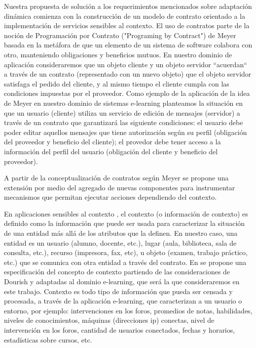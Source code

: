 Nuestra propuesta de solución a los requerimientos mencionados sobre adaptación
dinámica comienza con la construcción de un modelo de contrato orientado a la
implementación de servicios sensibles al contexto. El uso de contratos parte de
la noción de Programación por Contrato ("Programing by Contract") de Meyer
\cite{Meyer} basada en la metáfora de que un elemento de un sistema de software
colabora con otro, manteniendo obligaciones y beneficios mutuos. En nuestro
dominio de aplicación consideraremos que un objeto cliente y un objeto servidor
``acuerdan`` a través de un contrato (representado con un nuevo objeto) que el
objeto servidor satisfaga el pedido del cliente, y al mismo tiempo el cliente
cumpla con las condiciones impuestas por el proveedor. Como ejemplo de la
aplicación de la idea de Meyer en  nuestro dominio de sistemas e-learning
planteamos la situación en que un usuario (cliente) utiliza un servicio de
edición de mensajes (servidor) a través de un contrato que garantizará las
siguiente condiciones: el usuario debe poder editar aquellos mensajes que tiene
autorización según su perfil (obligación del proveedor y beneficio del cliente);
el provedor debe tener acceso a la información del perfil del usuario
(obligación del cliente y beneficio del proveedor).

A partir de la conceptualización de contratos según Meyer se propone una
extensión por medio del agregado de nuevas componentes para instrumentar
mecanismos que permitan ejecutar acciones dependiendo del contexto. 

En aplicaciones sensibles al contexto \cite{Dey}, el contexto (o información de
contexto) es definido como la información que puede ser usada para caracterizar
la situación de una entidad más allá de los atributos que la definen. En nuestro
caso, una entidad es un usuario (alumno, docente, etc.), lugar (aula,
biblioteca, sala de consulta, etc.), recurso (impresora, fax, etc), u objeto
(examen, trabajo práctico, etc.) que se comunica con otra entidad a través del
contrato. En \cite{libro5} se propone una especificación del concepto de
contexto partiendo de las consideraciones de Dourish \cite{contexto} y adaptadas
al dominio e-learning, que será la que consideraremos en este trabajo. Contexto
es todo tipo de información que pueda ser censada y procesada, a través de la
aplicación e-learning, que caracterizan a un usuario o entorno, por ejemplo:
intervenciones en los foros, promedios de notas, habilidades, niveles de
conocimientos, máquinas (direcciones ip) conectas, nivel de intervención en los
foros, cantidad de usuarios conectados, fechas y horarios, estadísticas sobre
cursos, etc.


